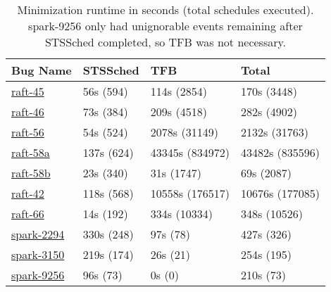 \begin{table}
\centering
\begin{tabular}{|l|l|l||l|}
  \cline{1-4}
  \textbf{Bug Name} &
  \textbf{STSSched} & \textbf{TFB} & \textbf{Total} \\\cline{1-4} \hline
\href{https://docs.google.com/document/d/1alldH4lRSpFQ55-YCNFaIcMpjxrBOMNaB7R_9eEVwfs}{raft-45}
& 56s \hfill (594) & 114s \hfill (2854) & 170s (3448) \\
\href{https://docs.google.com/document/d/1vhGftMIlmm_uFLmCz2GI0CCPmttDUR617hJ72k2BTbY}{raft-46}
& 73s \hfill (384) & 209s \hfill (4518) & 282s (4902) \\
\href{https://docs.google.com/document/d/1_UPKhjYoSrG9p4FQXqML_WQKa3WNbM2fch2aa0V-9Go}{raft-56}
& 54s \hfill (524) & 2078s \hfill (31149) & 2132s (31763) \\
\href{https://docs.google.com/document/d/1_efq5rbOGCG3sG-2qxbbOeIRztW9XYP6xgyh0QFmWXg}{raft-58a}
& 137s \hfill (624) & 43345s \hfill (834972) & 43482s (835596) \\
\href{https://docs.google.com/document/d/1eERBdohTC3UidHJ6cZq12ixpp_eiVqzT7LvzuTeEtR4}{raft-58b}
& 23s \hfill (340) & 31s \hfill (1747) & 69s (2087) \\ %
\href{https://docs.google.com/document/d/1BN4hpTKtN_-inqyT5XTGogI8QSlohnP2Y7A01nuW7TI}{raft-42}
& 118s \hfill (568) & 10558s \hfill (176517) & 10676s (177085) \\
\href{https://docs.google.com/document/d/1lCAR_IE_U27CA-VTlPCi4Kyxf4h6Ykx-0zbkHe0Gfbg}{raft-66}
& 14s \hfill (192) & 334s \hfill (10334) & 348s (10526) \\ %
\href{https://docs.google.com/document/d/1JQiaLlm6XwLCWKOBOFkaMzg8Gd7NT5gDH3_8OV-oekY}{spark-2294}
& 330s \hfill (248) & 97s \hfill (78) & 427s (326) \\


\href{https://docs.google.com/document/d/1mWbxS2-B0v4fbY_FIASs6HCmAXFh6K89DMYX-XEmeL8}{spark-3150}
& 219s \hfill (174) & 26s \hfill (21) & 254s (195) \\ %
\href{https://docs.google.com/document/d/1rPseAbo3FELT8Fj2lrRUMkrDmjLPYI26Jgr8goAMLzU}{spark-9256}
& 96s \hfill (73) & 0s \hfill (0) & 210s (73) \\
\hline
\end{tabular}
\caption{Minimization runtime in seconds (total schedules executed). spark-9256 only
had unignorable events remaining after STSSched completed, so TFB was not
necessary.}
\label{tab:runtime}
\end{table}

